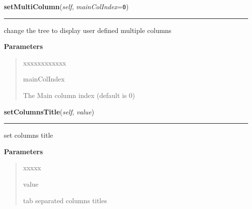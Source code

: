     \label{tracetool:WinTrace:setMultiColumn}

    \vspace{0.5ex}

\hspace{.8\funcindent}\begin{boxedminipage}{\funcwidth}

    \raggedright \textbf{setMultiColumn}(\textit{self}, \textit{mainColIndex}={\tt 0})

    \vspace{-1.5ex}

    \rule{\textwidth}{0.5\fboxrule}
\setlength{\parskip}{2ex}
    change the tree to display user defined multiple columns

\setlength{\parskip}{1ex}
      \textbf{Parameters}
      \vspace{-1ex}

      \begin{quote}
        \begin{Ventry}{xxxxxxxxxxxx}

          \item[mainColIndex]

          The Main column index (default is 0)

        \end{Ventry}

      \end{quote}

    \end{boxedminipage}

    \label{tracetool:WinTrace:setColumnsTitle}

    \vspace{0.5ex}

\hspace{.8\funcindent}\begin{boxedminipage}{\funcwidth}

    \raggedright \textbf{setColumnsTitle}(\textit{self}, \textit{value})

    \vspace{-1.5ex}

    \rule{\textwidth}{0.5\fboxrule}
\setlength{\parskip}{2ex}
    set columns title

\setlength{\parskip}{1ex}
      \textbf{Parameters}
      \vspace{-1ex}

      \begin{quote}
        \begin{Ventry}{xxxxx}

          \item[value]

          tab separated columns titles

        \end{Ventry}

      \end{quote}

    \end{boxedminipage}

